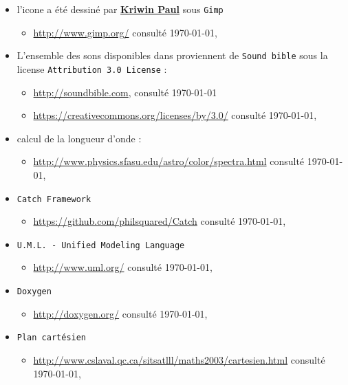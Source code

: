 \documentclass[a4paper,11pt]{report}
\begin{document}
\begin{itemize}
	\item[] l'icone a été dessiné par \href{mailto:39171@heb.be}{\textbf{Kriwin Paul}} sous
		\texttt{Gimp}
		\begin{itemize}
			\item \url{http://www.gimp.org/} consulté \today, \\
		\end{itemize}
	\item[] L'ensemble des sons disponibles dans 
		proviennent de \texttt{Sound bible}  sous la license 
		\texttt{Attribution 3.0 License} :
		\begin{itemize}
			\item \url{http://soundbible.com}, consulté \today
			\item \url{https://creativecommons.org/licenses/by/3.0/} consulté
				\today,\\
		\end{itemize}
	\item[] calcul de la longueur d'onde :
		\begin{itemize}
			\item \url{http://www.physics.sfasu.edu/astro/color/spectra.html}
				consulté \today, \\
		\end{itemize}
	\item[] \texttt{Catch Framework} 
		\begin{itemize}
			\item \url{https://github.com/philsquared/Catch} consulté \today,\\
		\end{itemize}
	\item[] \texttt{U.M.L. - Unified Modeling Language} 
		\begin{itemize}
			\item \url{http://www.uml.org/} consulté \today,\\
		\end{itemize}
	\item[] \texttt{Doxygen} 
		\begin{itemize}
			\item \url{http://doxygen.org/} consulté \today,\\
		\end{itemize}
	\item[] \texttt{Plan cartésien} 
		\begin{itemize}
			\item \url{http://www.cslaval.qc.ca/sitsatlll/maths2003/cartesien.html} consulté \today,\\

\end{itemize}
\end{itemize}
\end{document}
